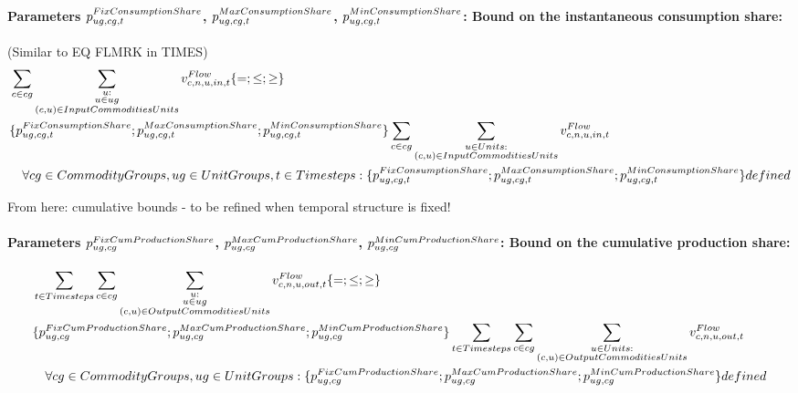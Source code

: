 \paragraph{Parameters $\pFixConsumptionShare$, $\pMaxConsumptionShare$, $\pMinConsumptionShare$: Bound on the instantaneous consumption share:}
(Similar to EQ FLMRK in TIMES)
\begin{align} \label{eq:consumptionshare}
&\sum_{\commodity \in \commoditygroup} \sum_{\substack{\unit: \\ \unit \in \unitgroup \\ \InputCommoditiesUnits}} \vFlow[\commodity,\node,\unit,in,\timestep]
 \{=;\le;\ge\} \nonumber \\
&\{ \pFixConsumptionShare ; \pMaxConsumptionShare ; \pMinConsumptionShare \} \sum_{\commodity \in \commoditygroup} \sum_{\substack{\units: \\ \InputCommoditiesUnits}} \vFlow[\commodity,\node, \unit,in,\timestep] \nonumber \\
&\quad \forall \commoditygroups, \unitgroups, \timesteps : \{ \pFixConsumptionShare ; \pMaxConsumptionShare ; \pMinConsumptionShare \} defined
\end{align}


{\color{red}From here: cumulative bounds - to be refined when temporal structure is fixed!}
\paragraph{Parameters $\pFixCumProductionShare$, $\pMaxCumProductionShare$, $\pMinCumProductionShare$: Bound on the cumulative production share:}
\begin{align} \label{eq:cumproductionshare}
&\sum_{\timesteps} \sum_{\commodity \in \commoditygroup} \sum_{\substack{\unit: \\ \unit \in \unitgroup \\ \OutputCommoditiesUnits}} \vFlow[\commodity,\node,\unit,out,\timestep]  \{=;\le;\ge\}  \nonumber \\
&\{ \pFixCumProductionShare ; \pMaxCumProductionShare ; \pMinCumProductionShare \} \sum_{\timesteps} \sum_{\commodity \in \commoditygroup} \sum_{\substack{\units: \\ \OutputCommoditiesUnits}} \vFlow[\commodity,\node, \unit,out,\timestep] \nonumber \\
&\quad \forall \commoditygroups, \unitgroups: \{ \pFixCumProductionShare ; \pMaxCumProductionShare ; \pMinCumProductionShare \} defined
\end{align}

